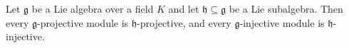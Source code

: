 Let $\mathfrak{g}$ be a Lie algebra over a field $K$ and let $\mathfrak{h} \subseteq \mathfrak{g}$ be a Lie subalgebra. Then every $\mathfrak{g}$-projective module is $\mathfrak{h}$-projective, and every $\mathfrak{g}$-injective module is $\mathfrak{h}$-injective.
